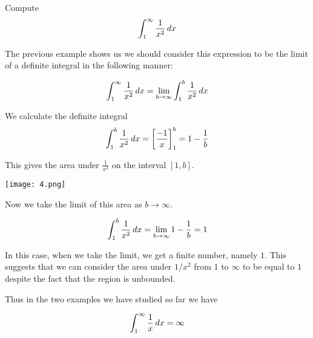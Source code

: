 \documentclass{ximera}
\begin{document}
\begin{example}
Compute 
\[
\int_{1}^{\infty} \frac{1}{x^2} \mathop{}\!d x
\]

\begin{explanation}
The previous example shows us we should consider this expression to be the limit of a definite integral 
in the following manner:

\[
\int_{1}^{\infty} \frac{1}{x^2} \mathop{}\!d x=\lim_{b \to \infty} \int_{1}^{b} \frac{1}{x^2} \mathop{}\!d x
\]

We calculate the definite integral 
\[
\int_{1}^{b} \frac{1}{x^2} \mathop{}\!d x= \bigg[ \frac{-1}{x} \bigg]_{1}^{b}=1-\frac{1}{b}
\]

This gives the area under $\frac{1}{x^2}$ on the interval $[1, b]$. 

\begin{image}
   \texttt{[image: 4.png]}
\end{image}

Now we take the limit of this area as $b \to \infty$. 

\[
\int_{1}^{b} \frac{1}{x^2} \mathop{}\!d x= \lim_{b \to \infty} 1-\frac{1}{b}=1
\]
  
In this case, when we take the limit, we get a finite number, namely $1$. This suggests that we can consider the 
area under $1/x^2$ from $1$ to $\infty$ to be equal to $1$ despite the fact that the region is unbounded. 



\end{explanation}
\end{example}






%



Thus in the two examples we have studied so far we have 


\[
\int_{1}^{\infty} \frac{1}{x} \mathop{}\!d x = \infty
\]
\end{document}
